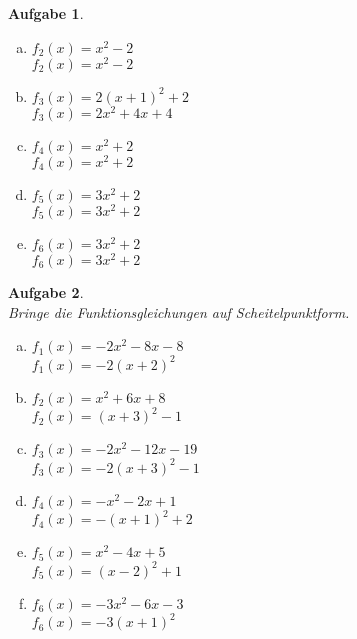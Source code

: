 \documentclass[12pt]{article}
\theoremstyle{note}
\newtheorem{aufgabe}{Aufgabe}
\begin{document}
\begin{flushleft}
\begin{aufgabe}
\begin{multicols}{3}
\begin{enumerate}[a)]
\item 
$f_2(x)=x^{2} - 2$ \\ 
$f_2(x)=x^{2} - 2$ \\ 

\item 
$f_3(x)=2 \left(x + 1\right)^{2} + 2$ \\ 
$f_3(x)=2 x^{2} + 4 x + 4$ \\ 

\item 
$f_4(x)=x^{2} + 2$ \\ 
$f_4(x)=x^{2} + 2$ \\ 

\item 
$f_5(x)=3 x^{2} + 2$ \\ 
$f_5(x)=3 x^{2} + 2$ \\ 

\item 
$f_6(x)=3 x^{2} + 2$ \\ 
$f_6(x)=3 x^{2} + 2$ \\ 

\end{enumerate} 
\end{multicols} 
\end{aufgabe} 
\begin{aufgabe} ~ \\ 
Bringe die Funktionsgleichungen auf Scheitelpunktform. \\ 
\begin{multicols}{3} 
\begin{enumerate}[a)] 
\item 
$f_1(x)=- 2 x^{2} - 8 x - 8$ \\ 
$f_1(x)=- 2 \left(x + 2\right)^{2}$ \\ 

\item 
$f_2(x)=x^{2} + 6 x + 8$ \\ 
$f_2(x)=\left(x + 3\right)^{2} - 1$ \\ 

\item 
$f_3(x)=- 2 x^{2} - 12 x - 19$ \\ 
$f_3(x)=- 2 \left(x + 3\right)^{2} - 1$ \\ 

\item 
$f_4(x)=- x^{2} - 2 x + 1$ \\ 
$f_4(x)=- \left(x + 1\right)^{2} + 2$ \\ 

\item 
$f_5(x)=x^{2} - 4 x + 5$ \\ 
$f_5(x)=\left(x - 2\right)^{2} + 1$ \\ 

\item 
$f_6(x)=- 3 x^{2} - 6 x - 3$ \\ 
$f_6(x)=- 3 \left(x + 1\right)^{2}$ \\ 

\end{enumerate} 
\end{multicols} 
\end{aufgabe} 
\end{flushleft} 
    
\end{document}
